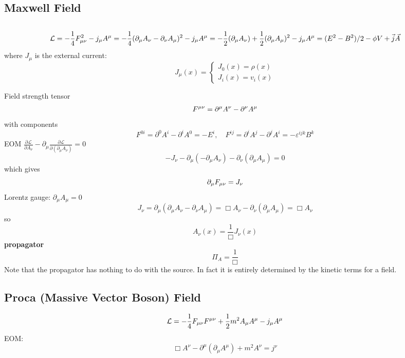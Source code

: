 \subsection{Maxwell Field}
\begin{equation}
    \label{Maxwell Eqn}
\end{equation}

\[ \mathcal{L} = -\frac{1}{4}F^2_{\mu\nu} - j_{\mu}A^{\mu} 
=-\frac{1}{4}(\partial_{\mu}A_\nu-\partial_{\nu}A_\mu)^2 - j_{\mu}A^{\mu} \\
=-\frac{1}{2}(\partial_{\mu}A_\nu) + \frac{1}{2}(\partial_{\mu}A_\mu)^2 - j_{\mu}A^{\mu}
=(E^2 - B^2)/2 - \phi V + \vec{j}\vec{A} \]
where $J_\mu$ is the external current:
\[ J_\mu(x) = \left\{ 
\begin{aligned}
    J_0(x) = \rho(x) \\
    J_i(x) = v_i(x)
\end{aligned}
\right.\]

Field strength tensor 
\[ F^{\mu\nu} = \partial^{\mu}A^{\nu} - \partial^{\nu}A^{\mu} \] 
with components 
\[ F^{0i} = \partial^{0}A^{i} - \partial^{i}A^{0} = -E^{i}, 
\quad
F^{ij} = \partial^{i}A^{j} - \partial^{j}A^{i} = -\varepsilon^{ijk}B^{k} \]
EOM
$\frac{\partial\mathcal{L}}{\partial{A_\nu}}-\partial_\mu\frac{\partial\mathcal{L}}{\partial(\partial_{\mu}A_\nu)}=0$
\[-J_\nu-\partial_\mu(-\partial_{\mu}A_\nu)-\partial_\nu(\partial_{\mu}A_\mu)=0\]
which gives
\[\partial_{\mu}F_{\mu\nu}=J_\nu\]
Lorentz gauge: $\partial_{\mu}A_{\mu}=0$
\[J_{\nu}=\partial_{\mu}(\partial_{\mu}A_\nu-\partial_{\nu}A_{\mu})=\Box{A_\nu}-\partial_{\nu}(\partial_{\mu}A_{\mu})
=\Box{A_{\nu}}\]
so
\[A_{\nu}(x)=\frac{1}{\Box}J_{\nu}(x)\]
\textbf{propagator}
\[\Pi_A=\frac{1}{\Box}\]
Note that the propagator has nothing to do with the source. In fact it is
entirely determined by the kinetic terms for a field.

\subsection{Proca (Massive Vector Boson) Field}
$$ \mathcal{L} = -\frac{1}{4}F_{\mu\nu}F^{\mu\nu} +
\frac{1}{2}m^{2}A_{\mu}A^{\mu} - j_{\mu}A^{\mu} $$
EOM:
$$ \Box A^{\nu} - \partial^{\mu}(\partial_{\mu}A^{\mu}) + m^{2}A^{\nu} =
j^{\nu}$$

